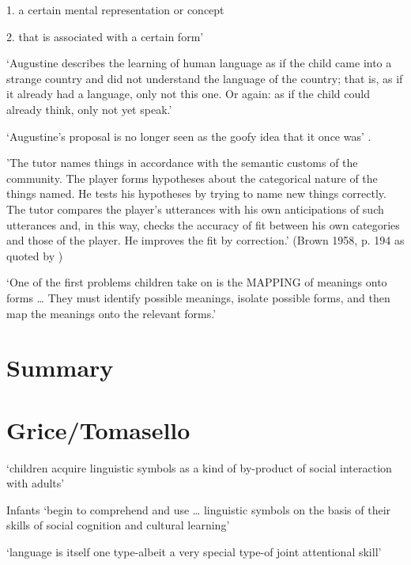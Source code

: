 \documentclass[12pt]{extarticle}
\begin{document}
\begin{multicols}{3}
1. a certain mental representation or concept

2.	that is associated with a certain form’

\citep[p.\ 17]{Bloom:2000qz}
 
‘Augustine describes the learning of human language as if the child came into a strange country and did not understand the language of the country; that is, as if it already had a language, only not this one. Or again: as if the child could already think, only not yet speak.’
\citep[15--16, §32]{Wittgenstein:1953mm}
 
‘Augustine’s proposal is no longer seen as the goofy idea that it once was’ \citep[p.\ 61]{Bloom:2000qz}.
 
'The tutor names things in accordance with the semantic customs of the community. The player forms hypotheses about the categorical nature of the things named. He tests his hypotheses by trying to name new things correctly. The tutor compares the player's utterances with his own anticipations of such utterances and, in this way, checks the accuracy of fit between his own categories and those of the player. He improves the fit by correction.'
(Brown 1958, p. 194 as quoted by \citep[p.\ 19]{Clark:1993bv})
 
‘One of the first problems children take on is the MAPPING of meanings onto forms … They must identify possible meanings, isolate possible forms, and then map the meanings onto the relevant forms.’
\citep[p.\ 14]{Clark:1993bv}
 
 
 
\section{Summary}
 
 
 
\section{Grice/Tomasello}
 
‘children acquire linguistic symbols as a kind of by-product of social interaction with adults’
\citep[p.\ 90]{Tomasello:2003fk}
 
Infants ‘begin to comprehend and use … linguistic symbols on the basis of their skills of social cognition and cultural learning’
\citep[p.\ 582]{Tomasello:1999en}
 
‘language is itself one type-albeit a very special type-of joint attentional skill’
\citep[p.\ 1120]{Tomasello:2001ic}
 

\end{multicols}
\end{document}
